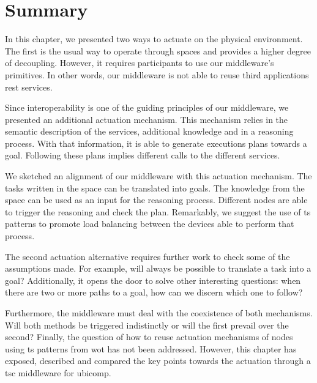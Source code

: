 \section{Summary}
\label{sec:actuation_summary}

In this chapter, we presented two ways to actuate on the physical environment.
The first is the usual way to operate through spaces and provides a higher degree of decoupling.
However, it requires participants to use our middleware's primitives. %
In other words, our middleware is not able to reuse third applications \ac{rest} services.


Since interoperability is one of the guiding principles of our middleware, we presented an additional actuation mechanism.
This mechanism relies in the semantic description of the services, additional knowledge and in a reasoning process. %
With that information, it is able to generate executions plans towards a goal.
Following these plans implies different calls to the different services.


We sketched an alignment of our middleware with this actuation mechanism.
The tasks written in the space can be translated into goals.
The knowledge from the space can be used as an input for the reasoning process.
Different nodes are able to trigger the reasoning and check the plan.
Remarkably, we suggest the use of \ac{ts} patterns to promote load balancing between the devices able to perform that process.


The second actuation alternative requires further work to check some of the assumptions made.
For example, will always be possible to translate a task into a goal?
Additionally, it opens the door to solve other interesting questions: when there are two or more paths to a goal, how can we discern which one to follow?


Furthermore, the middleware must deal with the coexistence of both mechanisms.
Will both methods be triggered indistinctly or will the first prevail over the second?
Finally, the question of how to reuse actuation mechanisms of nodes using \ac{ts} patterns from \ac{wot} has not been addressed.
However, this chapter has exposed, described and compared the key points towards the actuation through a \ac{tsc} middleware for \ac{ubicomp}.